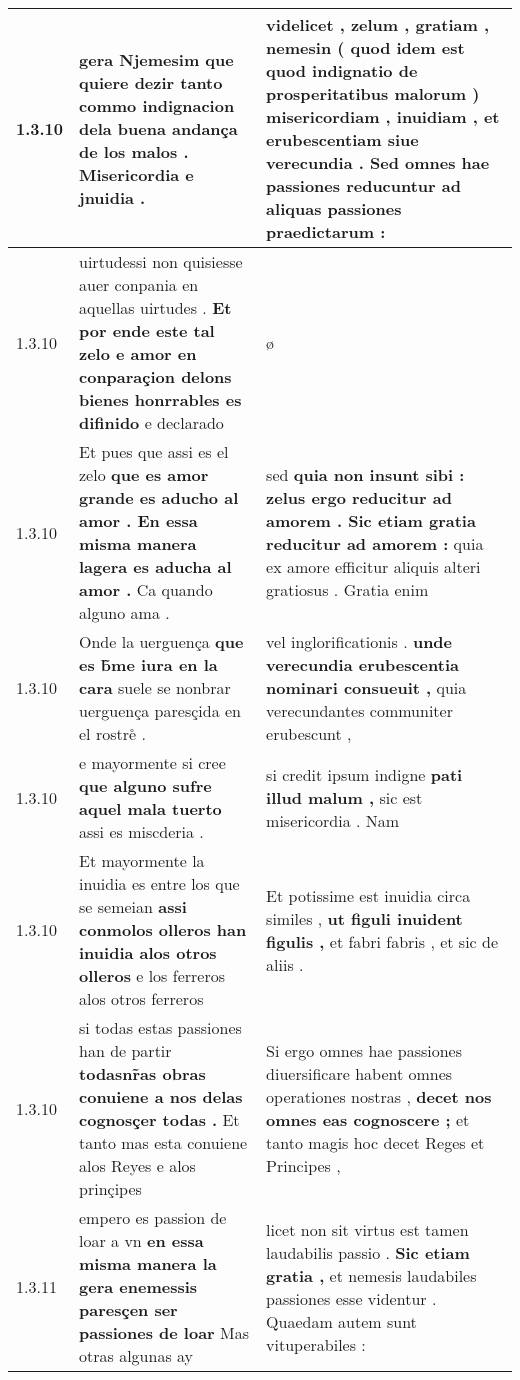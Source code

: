 \begin{tabular}{|p{1cm}|p{6.5cm}|p{6.5cm}|}
1.3.10 & gera Njemesim \textbf{ que quiere dezir tanto commo indignacion dela buena andança de los malos . } Misericordia e jnuidia . & videlicet , zelum , gratiam , nemesin \textbf{ ( quod idem est quod indignatio de prosperitatibus malorum ) misericordiam , inuidiam , et erubescentiam siue verecundia . } Sed omnes hae passiones reducuntur ad aliquas passiones praedictarum : \\\hline
1.3.10 & uirtudessi non quisiesse auer conpania en aquellas uirtudes . \textbf{ Et por ende este tal zelo e amor en conparaçion delons bienes honrrables es difinido } e declarado & ø \\\hline
1.3.10 & Et pues que assi es el zelo \textbf{ que es amor grande es aducho al amor . En essa misma manera lagera es aducha al amor . } Ca quando alguno ama . & sed \textbf{ quia non insunt sibi : zelus ergo reducitur ad amorem . Sic etiam gratia reducitur ad amorem : } quia ex amore efficitur aliquis alteri gratiosus . Gratia enim \\\hline
1.3.10 & Onde la uerguença \textbf{ que es b̃me iura en la cara } suele se nonbrar uerguença paresçida en el rostre̊ . & vel inglorificationis . \textbf{ unde verecundia erubescentia nominari consueuit , } quia verecundantes communiter erubescunt , \\\hline
1.3.10 & e mayormente si cree \textbf{ que alguno sufre aquel mala tuerto } assi es miscderia . & si credit ipsum indigne \textbf{ pati illud malum , } sic est misericordia . Nam \\\hline
1.3.10 & Et mayormente la inuidia es entre los que se semeian \textbf{ assi conmolos olleros han inuidia alos otros olleros } e los ferreros alos otros ferreros & Et potissime est inuidia circa similes , \textbf{ ut figuli inuident figulis , } et fabri fabris , et sic de aliis . \\\hline
1.3.10 & si todas estas passiones han de partir \textbf{ todasnr̃as obras conuiene a nos delas cognosçer todas . } Et tanto mas esta conuiene alos Reyes e alos prinçipes & Si ergo omnes hae passiones diuersificare habent omnes operationes nostras , \textbf{ decet nos omnes eas cognoscere ; } et tanto magis hoc decet Reges et Principes , \\\hline
1.3.11 & empero es passion de loar a vn \textbf{ en essa misma manera la gera enemessis paresçen ser passiones de loar } Mas otras algunas ay & licet non sit virtus est tamen laudabilis passio . \textbf{ Sic etiam gratia , } et nemesis laudabiles passiones esse videntur . Quaedam autem sunt vituperabiles : \\\hline

\end{tabular}
